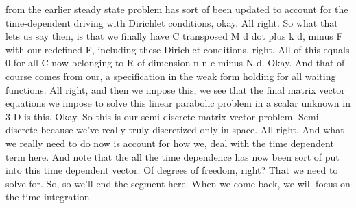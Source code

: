 \documentclass[10pt]{article}
\begin{document}
from the earlier steady state problem has sort of been updated to account for the time-dependent driving with Dirichlet conditions, okay. All right. So what that lets us say then, is that we finally have C transposed M d dot plus k d, minus F with our redefined F, including these Dirichlet conditions, right. All of this equals 0 for all C now belonging to R of dimension n n e minus N d. Okay. And that of course comes from our, a specification in the weak form holding for all waiting functions. All right, and then we impose this, we see that the final matrix vector equations we impose to solve this linear parabolic problem in a scalar unknown in 3 D is this. Okay. So this is our semi discrete matrix vector problem. Semi discrete because we've really truly discretized only in space. All right. And what we really need to do now is account for how we, deal with the time dependent term here. And note that the all the time dependence has now been sort of put into this time dependent vector. Of degrees of freedom, right? That we need to solve for. So, so we'll end the segment here. When we come back, we will focus on the time integration.
\end{document}
